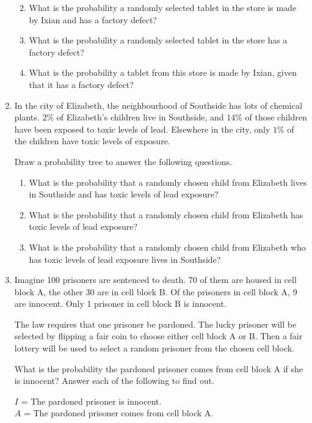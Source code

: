 \documentclass[]{tufte-book}
\providecommand{\tightlist}{%
  \setlength{\itemsep}{0pt}\setlength{\parskip}{0pt}}
\begin{document}
\begin{enumerate}
  \begin{enumerate}
  \def\labelenumii{\alph{enumii}.}
  \tightlist
  \item
    What is the probability a randomly selected tablet in the store is made by Ixian and has a factory defect?
  \item
    What is the probability a randomly selected tablet in the store has a factory defect?
  \item
    What is the probability a tablet from this store is made by Ixian, given that it has a factory defect?
  \end{enumerate}
\item
  In the city of Elizabeth, the neighbourhood of Southside has lots of chemical plants. \(2\%\) of Elizabeth's children live in Southside, and \(14\%\) of those children have been exposed to toxic levels of lead. Elsewhere in the city, only \(1\%\) of the children have toxic levels of exposure.

  Draw a probability tree to answer the following questions.

  \begin{enumerate}
  \def\labelenumii{\alph{enumii}.}
  \tightlist
  \item
    What is the probability that a randomly chosen child from Elizabeth lives in Southside and has toxic levels of lead exposure?
  \item
    What is the probability that a randomly chosen child from Elizabeth has toxic levels of lead exposure?
  \item
    What is the probability that a randomly chosen child from Elizabeth who has toxic levels of lead exposure lives in Southside?
  \end{enumerate}
\item
  Imagine 100 prisoners are sentenced to death. 70 of them are housed in cell block A, the other 30 are in cell block B. Of the prisoners in cell block A, 9 are innocent. Only 1 prisoner in cell block B is innocent.

  The law requires that one prisoner be pardoned. The lucky prisoner will be selected by flipping a fair coin to choose either cell block A or B. Then a fair lottery will be used to select a random prisoner from the chosen cell block.

  What is the probability the pardoned prisoner comes from cell block A if she is innocent? Answer each of the following to find out.

  \(I\) = The pardoned prisoner is innocent.\\
  \(A\) = The pardoned prisoner comes from cell block A.


\end{enumerate}
\end{document}
